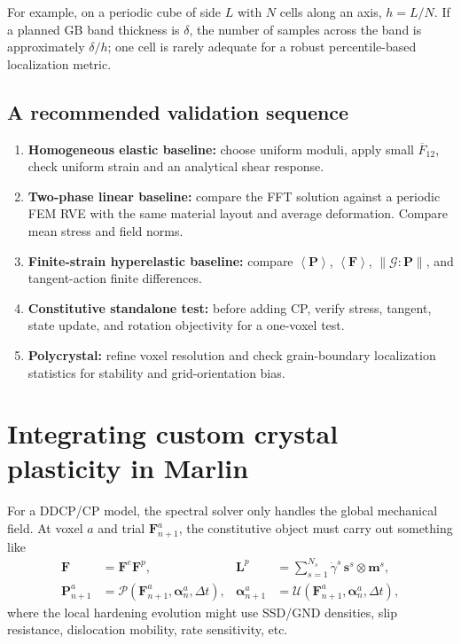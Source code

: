 \documentclass[11pt,a4paper]{article}
\newcommand{\avg}[1]{\left\langle #1\right\rangle}
\newcommand{\mb}[1]{\boldsymbol{#1}}
\begin{document}
For example, on a periodic cube of side $L$ with $N$ cells along an axis, $h=L/N$. If a planned GB band thickness is $\delta$, the number of samples across the band is approximately $\delta/h$; one cell is rarely adequate for a robust percentile-based localization metric.

\subsection{A recommended validation sequence}
\begin{enumerate}
\item \textbf{Homogeneous elastic baseline:} choose uniform moduli, apply small $\overline F_{12}$, check uniform strain and an analytical shear response.
\item \textbf{Two-phase linear baseline:} compare the FFT solution against a periodic FEM RVE with the same material layout and average deformation. Compare mean stress and field norms.
\item \textbf{Finite-strain hyperelastic baseline:} compare $\avg{\mathbf P}$, $\avg{\mathbf F}$, $\|\mathcal G:\mathbf P\|$, and tangent-action finite differences.
\item \textbf{Constitutive standalone test:} before adding CP, verify stress, tangent, state update, and rotation objectivity for a one-voxel test.
\item \textbf{Polycrystal:} refine voxel resolution and check grain-boundary localization statistics for stability and grid-orientation bias.
\end{enumerate}

\section{Integrating custom crystal plasticity in Marlin}
\label{sec:cp}
For a DDCP/CP model, the spectral solver only handles the global mechanical field. At voxel $a$ and trial $\mathbf F^{a}_{n+1}$, the constitutive object must carry out something like
\begin{align}
\mathbf F &=\mathbf F^e\mathbf F^p,&
\mathbf L^p&=\sum_{s=1}^{N_s}\dot\gamma^s\,\mathbf s^s\otimes\mathbf m^s,\\
\mathbf P^{a}_{n+1}&=\mathcal P(\mathbf F^{a}_{n+1},\mb\alpha_n^a,\Delta t),&
\mb\alpha^{a}_{n+1}&=\mathcal U(\mathbf F^{a}_{n+1},\mb\alpha_n^a,\Delta t),
\end{align}
where the local hardening evolution might use SSD/GND densities, slip resistance, dislocation mobility, rate sensitivity, etc.
\end{document}
